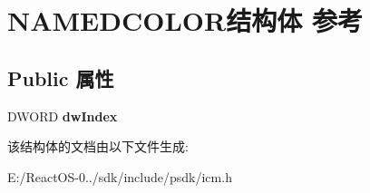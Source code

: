 \hypertarget{struct_n_a_m_e_d_c_o_l_o_r}{}\section{N\+A\+M\+E\+D\+C\+O\+L\+O\+R结构体 参考}
\label{struct_n_a_m_e_d_c_o_l_o_r}
\subsection*{Public 属性}
\begin{DoxyCompactItemize}
\item 
\mbox{\label{struct_n_a_m_e_d_c_o_l_o_r_a9c049eb17ce93a3c3b9b300429ecbc34}} 
D\+W\+O\+RD {\bfseries dw\+Index}
\end{DoxyCompactItemize}


该结构体的文档由以下文件生成\+:\begin{DoxyCompactItemize}
\item 
E\+:/\+React\+O\+S-\/0../sdk/include/psdk/icm.\+h\end{DoxyCompactItemize}
